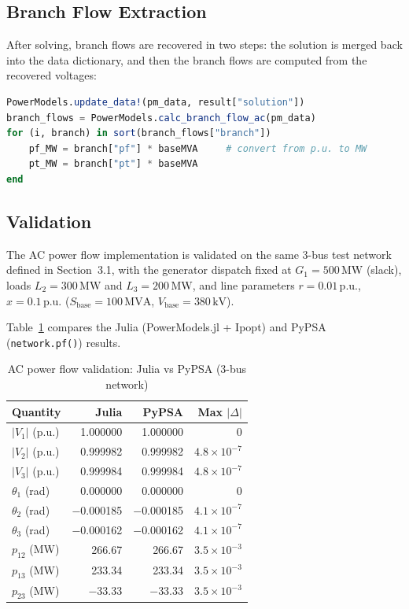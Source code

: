 \subsection{Branch Flow Extraction}

After solving, branch flows are recovered in two steps: the solution is merged back into the data dictionary, and then the branch flows are computed from the recovered voltages:

\begin{lstlisting}[language=Julia, caption={Extracting branch flows from PowerModels solution}, label={lst:branch_flows}]
PowerModels.update_data!(pm_data, result["solution"])
branch_flows = PowerModels.calc_branch_flow_ac(pm_data)
for (i, branch) in sort(branch_flows["branch"])
    pf_MW = branch["pf"] * baseMVA     # convert from p.u. to MW
    pt_MW = branch["pt"] * baseMVA
end
\end{lstlisting}

\subsection{Validation}

The AC power flow implementation is validated on the same 3-bus test network defined in Section~3.1, with the generator dispatch fixed at $G_1 = 500\,\text{MW}$ (slack), loads $L_2 = 300\,\text{MW}$ and $L_3 = 200\,\text{MW}$, and line parameters $r = 0.01\,\text{p.u.}$, $x = 0.1\,\text{p.u.}$ ($S_\text{base} = 100\,\text{MVA}$, $V_\text{base} = 380\,\text{kV}$).

Table~\ref{tab:ac_validation} compares the Julia (PowerModels.jl + Ipopt) and PyPSA (\texttt{network.pf()}) results.

\begin{table}[H]
\centering
\caption{AC power flow validation: Julia vs PyPSA (3-bus network)}
\label{tab:ac_validation}
\begin{tabular}{lrrr}
\toprule
\textbf{Quantity} & \textbf{Julia} & \textbf{PyPSA} & \textbf{Max $|\Delta|$} \\
\midrule
$|V_1|$ (p.u.)    & 1.000000  & 1.000000  & 0 \\
$|V_2|$ (p.u.)    & 0.999982  & 0.999982  & $4.8 \times 10^{-7}$ \\
$|V_3|$ (p.u.)    & 0.999984  & 0.999984  & $4.8 \times 10^{-7}$ \\
$\theta_1$ (rad)  & 0.000000  & 0.000000  & 0 \\
$\theta_2$ (rad)  & $-$0.000185 & $-$0.000185 & $4.1 \times 10^{-7}$ \\
$\theta_3$ (rad)  & $-$0.000162 & $-$0.000162 & $4.1 \times 10^{-7}$ \\
$p_{12}$ (MW)     & 266.67    & 266.67    & $3.5 \times 10^{-3}$ \\
$p_{13}$ (MW)     & 233.34    & 233.34    & $3.5 \times 10^{-3}$ \\
$p_{23}$ (MW)     & $-$33.33  & $-$33.33  & $3.5 \times 10^{-3}$ \\
\bottomrule
\end{tabular}
\end{table}

